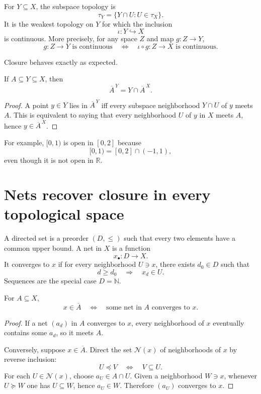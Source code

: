 For \(Y\subseteq X\), the subspace topology is
\[
  \tau_Y=\{Y\cap U:U\in\tau_X\}.
\]
It is the weakest topology on \(Y\) for which the inclusion
\[
  \iota:Y\hookrightarrow X
\]
is continuous.  More precisely, for any space \(Z\) and map \(g:Z\to Y\),
\[
  g:Z\to Y\text{ is continuous}
  \quad\Longleftrightarrow\quad
  \iota\circ g:Z\to X\text{ is continuous}.
\]

Closure behaves exactly as expected.

\begin{proposition}
If \(A\subseteq Y\subseteq X\), then
\[
  \boxed{\overline A^{\,Y}=Y\cap\overline A^{\,X}.}
\]
\end{proposition}

\begin{proof}
A point \(y\in Y\) lies in \(\overline A^{\,Y}\) iff every subspace neighborhood \(Y\cap U\) of \(y\) meets \(A\).  This is equivalent to saying that every neighborhood \(U\) of \(y\) in \(X\) meets \(A\), hence \(y\in\overline A^{\,X}\).
\end{proof}

For example, \([0,1)\) is open in \([0,2]\) because
\[
  [0,1)=[0,2]\cap(-1,1),
\]
even though it is not open in \(\mathbb R\).

\section{Nets recover closure in every topological space}

A directed set is a preorder \((D,\le)\) such that every two elements have a common upper bound.  A net in \(X\) is a function
\[
  x_\bullet:D\to X.
\]
It converges to \(x\) if for every neighborhood \(U\ni x\), there exists \(d_0\in D\) such that
\[
  d\ge d_0\quad\Longrightarrow\quad x_d\in U.
\]
Sequences are the special case \(D=\mathbb N\).

\begin{theorem}
For \(A\subseteq X\),
\[
  x\in\overline A
  \quad\Longleftrightarrow\quad
  \text{some net in }A\text{ converges to }x.
\]
\end{theorem}

\begin{proof}
If a net \((a_d)\) in \(A\) converges to \(x\), every neighborhood of \(x\) eventually contains some \(a_d\), so it meets \(A\).

Conversely, suppose \(x\in\overline A\).  Direct the set \(\mathcal N(x)\) of neighborhoods of \(x\) by reverse inclusion:
\[
  U\preceq V\quad\Longleftrightarrow\quad V\subseteq U.
\]
For each \(U\in\mathcal N(x)\), choose \(a_U\in A\cap U\).  Given a neighborhood \(W\ni x\), whenever \(U\succeq W\) one has \(U\subseteq W\), hence \(a_U\in W\).  Therefore \((a_U)\) converges to \(x\).
\end{proof}

